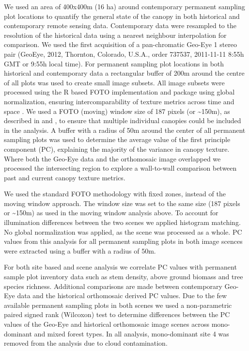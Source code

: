 \documentclass[remote sensing,article,submit,moreauthors,pdftex,10pt,a4paper]{mdpi}
\begin{document}
We used an area of 400x400m (16 ha) around contemporary permanent
sampling plot locations to quantify the general state of the canopy in
both historical and contemporary remote sensing data. Contemporary data
were resampled to the resolution of the historical data using a nearest
neighbour interpolation for comparison. We used the first acquisition of
a pan-chromatic Geo-Eye 1 stereo pair (GeoEye, 2012, Thornton, Colorado,
U.S.A., order 737537, 2011-11-11 8:55h GMT or 9:55h local time). For
permanent sampling plot locations in both historical and contemporary
data a rectangular buffer of 200m around the centre of all plots was
used to create small image subsets. All image subsets were processed
using the R based FOTO implementation and package \citep{hufkens2019a}
using global normalization, ensuring intercomparability of texture
metrics across time and space \citep{Barbier2010}. We used a FOTO
(moving) window size of 187 pixels (or \textasciitilde{}150m), as
described in \citet{solorzano2018} and \citet{Barbier2010}, to ensure
that multiple individual canopies could be included in the analysis. A
buffer with a radius of 50m around the center of all permanent sampling
plots was used to determine the average value of the first principle
component (PC), explaining the majority of the variance in canopy
texture. Where both the Geo-Eye data and the orthomosaic image
overlapped we processed the intersecting region to explore a
wall-to-wall comparison between past and current canopy texture metrics.

We used the standard FOTO methodology with fixed zones, instead of the
moving window approach. The window size was set to the same size (187
pixels or \textasciitilde{}150m) as used in the moving window analysis
above. To account for illumination differences between the two scenes we
applied histogram matching. No global normalization was applied, as the
scene was processed as a whole. PC values from this analysis for all
permanent sampling plots in both image scences were extracted using a
buffer with a radius of 50m.

For both site based and scene analysis we correlate PC values with
permanent sample plot inventory data such as stem density, above ground
biomass and tree species richness. Additional comparisons are made
between contemporary Geo-Eye data and the historical orthomosaic derived
PC values. Due to the few available permanent sampling plots in both
scenes we used a non-parametric paired signed rank (Wilcoxon) test to
determine differences between the PC values of the Geo-Eye and
historical orthomosaic image scenes across mono-dominant and mixed
forest types. In all analysis, mono-dominant site 4 was removed from the
analysis due to cloud contamination.
\end{document}
